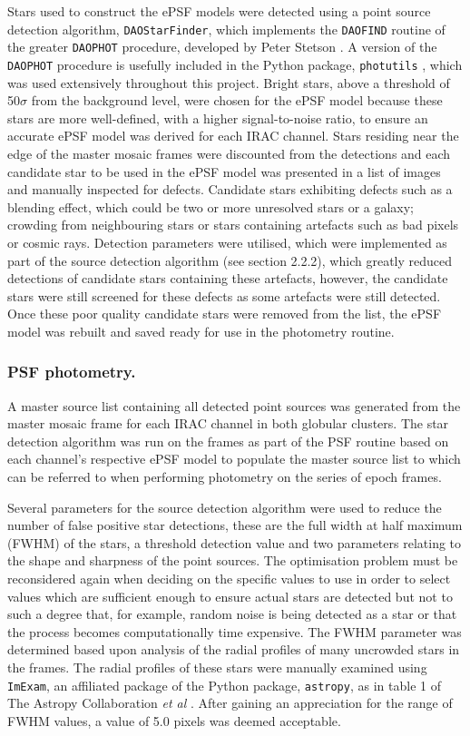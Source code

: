 \documentclass[11pt]{iopart}
\begin{document}
Stars used to construct the ePSF models were detected using a point source detection algorithm, \verb"DAOStarFinder", which implements the \verb"DAOFIND" routine of the greater \verb"DAOPHOT" procedure, developed by Peter Stetson \cite{stetson1987}. A version of the \verb"DAOPHOT" procedure is usefully included in the Python package, \verb"photutils" \cite{photutils}, which was used extensively throughout this project. Bright stars, above a threshold of 50$\sigma$ from the background level, were chosen for the ePSF model because these stars are more well-defined, with a higher signal-to-noise ratio, to ensure an accurate ePSF model was derived for each IRAC channel. Stars residing near the edge of the master mosaic frames were discounted from the detections and each candidate star to be used in the ePSF model was presented in a list of images and manually inspected for defects. Candidate stars exhibiting defects such as a blending effect, which could be two or more unresolved stars or a galaxy; crowding from neighbouring stars or stars containing artefacts such as bad pixels or cosmic rays. Detection parameters were utilised, which were implemented as part of the source detection algorithm (see section 2.2.2), which greatly reduced detections of candidate stars containing these artefacts, however, the candidate stars were still screened for these defects as some artefacts were still detected. Once these poor quality candidate stars were removed from the list, the ePSF model was rebuilt and saved ready for use in the photometry routine.

\subsubsection{PSF photometry.}
A master source list containing all detected point sources was generated from the master mosaic frame for each IRAC channel in both globular clusters. The star detection algorithm was run on the frames as part of the PSF routine based on each channel's respective ePSF model to populate the master source list to which can be referred to when performing photometry on the series of epoch frames.

Several parameters for the source detection algorithm were used to reduce the number of false positive star detections, these are the full width at half maximum (FWHM) of the stars, a threshold detection value and two parameters relating to the shape and sharpness of the point sources. The optimisation problem must be reconsidered again when deciding on the specific values to use in order to select values which are sufficient enough to ensure actual stars are detected but not to such a degree that, for example, random noise is being detected as a star or that the process becomes computationally time expensive. The FWHM parameter was determined based upon analysis of the radial profiles of many uncrowded stars in the frames. The radial profiles of these stars were manually examined using \verb"ImExam", an affiliated package of the Python package, \verb"astropy", as in table 1 of The Astropy Collaboration \textit{et al} \cite{astropy}. After gaining an appreciation for the range of FWHM values, a value of 5.0 pixels was deemed acceptable.
\end{document}
